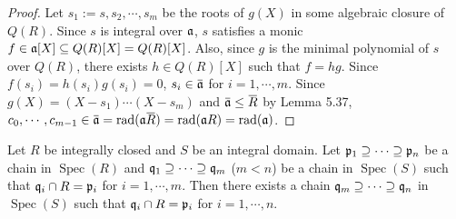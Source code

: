 \begin{proof}
    Let $s_1:=s,s_2,\cdots,s_m$ be the roots of $g(X)$ in some algebraic closure of $Q(R)$. Since $s$ is integral over $\mathfrak{a}$, $s$ satisfies a monic $f \in \mathfrak{a}[X] \subseteq Q(R)[X] = Q(R)[X]$. Also, since $g$ is the minimal polynomial of $s$ over $Q(R)$, there exists $h \in Q(R)[X]$ such that $f = hg$. Since $f(s_i) = h(s_i)g(s_i) = 0$, $s_i \in \overbar{\ffa}$ for $i = 1,\cdots,m$. Since $g(X) = (X-s_1) \cdots (X-s_m)$ and $\overbar{\ffa} \leq \overbar{R}$ by Lemma 5.37, $c_0,\cdots,c_{m-1} \in \overbar{\ffa} = \operatorname{rad}(\ffa \overbar{R}) = \operatorname{rad}(\ffa R) = \operatorname{rad}(\ffa)$. 
\end{proof}

\begin{theorem}
    Let $R$ be integrally closed and $S$ be an integral domain. Let $\mathfrak{p}_1 \supseteq \cdots \supseteq \mathfrak{p}_n$ be a chain in $\operatorname{Spec}(R)$ and $\mathfrak{q}_1 \supseteq \cdots \supseteq \mathfrak{q}_m$ ($m < n$) be a chain in $\operatorname{Spec}(S)$ such that $\mathfrak{q}_i \cap R = \mathfrak{p}_i$ for $i = 1,\cdots,m$. Then there exists a chain $\mathfrak{q}_m \supseteq \cdots \supseteq \mathfrak{q}_n$ in $\operatorname{Spec}(S)$ such that $\mathfrak{q}_i \cap R = \mathfrak{p}_i$ for $i = 1,\cdots,n$. 
\end{theorem}

